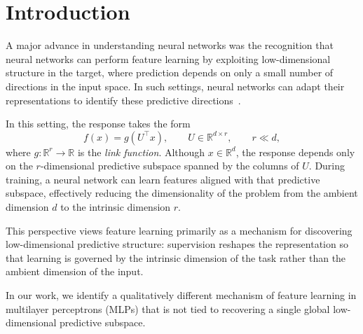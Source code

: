 \documentclass{article}
\newcounter{setting}[section]
\begin{document}
\section{Introduction}


A major advance in understanding neural networks was the recognition that neural networks can perform feature learning by exploiting low-dimensional structure in the target, where prediction depends on only a small number of directions in the input space. In such settings, neural networks can adapt their representations to identify these predictive directions~\citep{bach2017breaking,soltanolkotabi2017learning,yehudai2019power,wei2019regularization,ghorbani2019limitations,ghorbani2020when,malach2021quantifying,abbe2022merged,abbe2023sgd,ba2022highdimensional,damian2022neural,dandi2024giant,bruna2025survey}.

In this setting, the response takes the form
\[
f(x)
=
g\!\left(U^{\top}x\right),
\qquad
U\in\mathbb{R}^{d\times r},
\qquad
r\ll d,
\]
where \(g:\mathbb{R}^r\to\mathbb{R}\) is the \emph{link function}. Although \(x\in\mathbb{R}^d\), the response
depends only on the \(r\)-dimensional predictive subspace spanned by the
columns of $U$.
During training, a neural network can learn features aligned with that predictive subspace, effectively reducing the dimensionality of the problem from the ambient dimension $d$ to the intrinsic dimension $r$.


This perspective views feature learning primarily as a mechanism for discovering low-dimensional predictive structure: supervision reshapes the representation so that learning is governed by the intrinsic dimension of the task rather than the ambient dimension of the input.



In our work, we identify a qualitatively different mechanism of feature learning
in multilayer perceptrons (MLPs) that is not tied to recovering a
single global low-dimensional predictive subspace.
\end{document}
